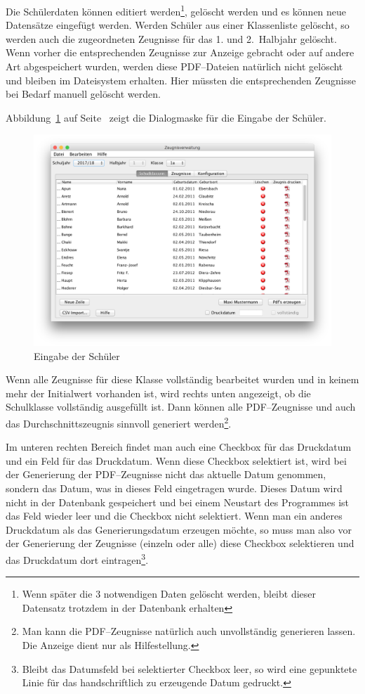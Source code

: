 \documentclass[a4paper,notitlepage,parskip]{scrartcl}
\begin{document}
Die Schülerdaten können editiert werden\footnote{Wenn später die 3 notwendigen Daten gelöscht werden, bleibt dieser Datensatz trotzdem in der Datenbank erhalten}, gelöscht werden und es können neue Datensätze eingefügt werden. Werden Schüler aus einer Klassenliste gelöscht, so werden auch die zugeordneten Zeugnisse für das 1. und 2.~Halbjahr gelöscht.
Wenn vorher die entsprechenden Zeugnisse zur Anzeige gebracht oder auf andere Art abgespeichert wurden, werden diese PDF--Dateien natürlich nicht gelöscht und bleiben im Dateisystem erhalten. Hier müssten die entsprechenden Zeugnisse bei Bedarf manuell gelöscht werden.

Abbildung~\ref{fig:Schulklassen} auf Seite~\pageref{fig:Schulklassen} zeigt die Dialogmaske für die Eingabe der Schüler.

\begin{figure}[ht]
\centering
\centerline{\includegraphics[width=1.0\textwidth]{Schulklassen}}
\caption{Eingabe der Schüler}
\label{fig:Schulklassen}
\end{figure}

Wenn alle Zeugnisse für diese Klasse vollständig bearbeitet wurden und in keinem mehr der Initialwert vorhanden ist, wird rechts unten angezeigt, ob die Schulklasse vollständig ausgefüllt ist.
Dann können alle PDF--Zeugnisse und auch das Durchschnittszeugnis sinnvoll generiert werden\footnote{Man kann die PDF--Zeugnisse natürlich auch unvollständig generieren lassen. Die Anzeige dient nur als Hilfestellung.}.

Im unteren rechten Bereich findet man auch eine Checkbox für das Druckdatum und ein Feld für das Druckdatum.
Wenn diese Checkbox selektiert ist, wird bei der Generierung der PDF--Zeugnisse nicht das aktuelle Datum genommen, sondern das Datum, was in dieses Feld eingetragen wurde.
Dieses Datum wird nicht in der Datenbank gespeichert und bei einem Neustart des Programmes ist das Feld wieder leer und die Checkbox nicht selektiert.
Wenn man ein anderes Druckdatum als das Generierungsdatum erzeugen möchte, so muss man also vor der Generierung der Zeugnisse (einzeln oder alle) diese Checkbox selektieren und das Druckdatum dort eintragen\footnote{Bleibt das Datumsfeld bei selektierter Checkbox leer, so wird eine gepunktete Linie für das handschriftlich zu erzeugende Datum gedruckt.}.
\end{document}

